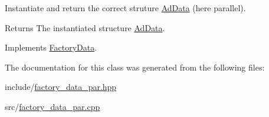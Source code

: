 \-Instantiate and return the correct struture \hyperlink{classAdData}{\-Ad\-Data} (here parallel). 

\begin{DoxyReturn}{\-Returns}
\-The instantiated structure \hyperlink{classAdData}{\-Ad\-Data}. 
\end{DoxyReturn}


\-Implements \hyperlink{classFactoryData_aba11718dd6b6ccb576c40b30ec8d55a0}{\-Factory\-Data}.



\-The documentation for this class was generated from the following files\-:\begin{DoxyCompactItemize}
\item 
include/\hyperlink{factory__data__par_8hpp}{factory\-\_\-data\-\_\-par.\-hpp}\item 
src/\hyperlink{factory__data__par_8cpp}{factory\-\_\-data\-\_\-par.\-cpp}\end{DoxyCompactItemize}
